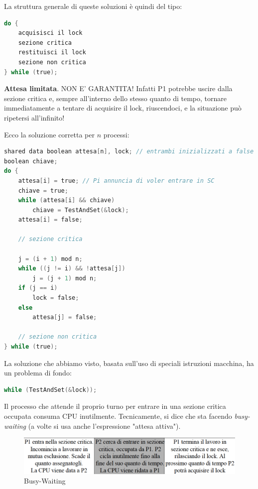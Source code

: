La struttura generale di queste soluzioni è quindi del tipo:
\begin{lstlisting}[language=C]
do {
    acquisisci il lock
    sezione critica
    restituisci il lock
    sezione non critica
} while (true);
\end{lstlisting}
\textbf{Attesa limitata}. NON E’ GARANTITA! Infatti P1 potrebbe uscire dalla sezione critica  e, sempre all'interno dello stesso quanto di tempo, tornare immediatamente a tentare di acquisire il lock, riuscendoci, e la situazione può ripetersi all'infinito!\\

Ecco la soluzione corretta per $n$ processi:
\begin{lstlisting}[language=C]
shared data boolean attesa[n], lock; // entrambi inizializzati a false
boolean chiave;
do {
    attesa[i] = true; // Pi annuncia di voler entrare in SC
    chiave = true;
    while (attesa[i] && chiave) 
        chiave = TestAndSet(&lock);
    attesa[i] = false;

    // sezione critica

    j = (i + 1) mod n;
    while ((j != i) && !attesa[j]) 
        j = (j + 1) mod n;
    if (j == i) 
        lock = false;
    else 
        attesa[j] = false;

    // sezione non critica
} while (true);
\end{lstlisting}

La soluzione che abbiamo visto, basata sull'uso di speciali istruzioni macchina, ha un problema di fondo:
\begin{lstlisting}[language=C]
while (TestAndSet(&lock));
\end{lstlisting}
Il processo che attende il proprio turno per entrare in una sezione critica occupata consuma CPU inutilmente. Tecnicamente, si dice che sta facendo \textit{busy-waiting} (a volte si usa anche l'espressione "attesa attiva").

\begin{figure}[h]
    \centering
    \includegraphics[width=0.5\linewidth]{images/busyWaiting_critics.png}
    \caption{Busy-Waiting}
    \label{fig:busyWaiting_critics}
\end{figure}

